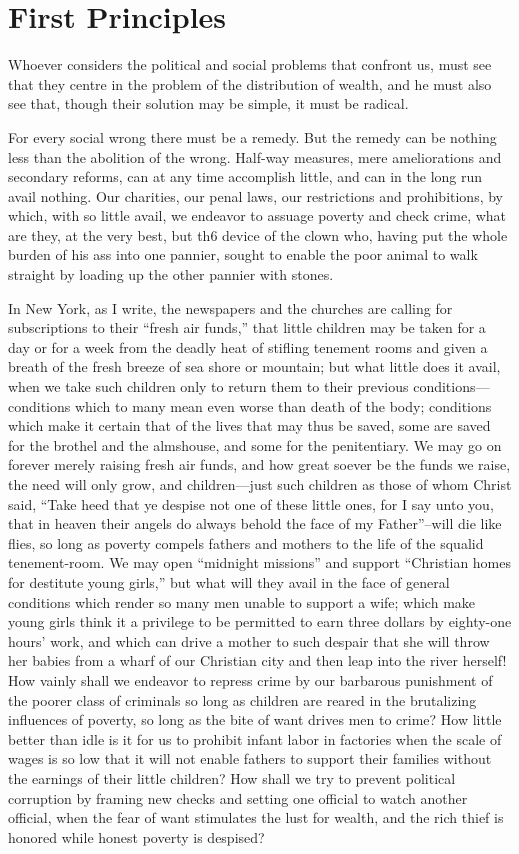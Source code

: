 \documentclass{book}
\begin{document}
\chapter{First Principles}
\label{chapter-9}
Whoever considers the political and social problems that confront us, must see that they centre in the problem of the distribution of wealth, and he must also see that, though their solution may be simple, it must be radical.

For every social wrong there must be a remedy. But the remedy can be nothing less than the abolition of the wrong. Half-way measures, mere ameliorations and secondary reforms, can at any time accomplish little, and can in the long run avail nothing. Our charities, our penal laws, our restrictions and prohibitions, by which, with so little avail, we endeavor to assuage poverty and check crime, what are they, at the very best, but th6 device of the clown who, having put the whole burden of his ass into one pannier, sought to enable the poor animal to walk straight by loading up the other pannier with stones.

In New York, as I write, the newspapers and the churches are calling for subscriptions to their “fresh air funds,” that little children may be taken for a day or for a week from the deadly heat of stifling tenement rooms and given a breath of the fresh breeze of sea shore or mountain; but what little does it avail, when we take such children only to return them to their previous conditions—conditions which to many mean even worse than death of the body; conditions which make it certain that of the lives that may thus be saved, some are saved for the brothel and the almshouse, and some for the penitentiary. We may go on forever merely raising fresh air funds, and how great soever be the funds we raise, the need will only grow, and children—just such children as those of whom Christ said, “Take heed that ye despise not one of these little ones, for I say unto you, that in heaven their angels do always behold the face of my Father”–will die like flies, so long as poverty compels fathers and mothers to the life of the squalid tenement-room. We may open “midnight missions” and support “Christian homes for destitute young girls,” but what will they avail in the face of general conditions which render so many men unable to support a wife; which make young girls think it a privilege to be permitted to earn three dollars by eighty-one hours’ work, and which can drive a mother to such despair that she will throw her babies from a wharf of our Christian city and then leap into the river herself! How vainly shall we endeavor to repress crime by our barbarous punishment of the poorer class of criminals so long as children are reared in the brutalizing influences of poverty, so long as the bite of want drives men to crime? How little better than idle is it for us to prohibit infant labor in factories when the scale of wages is so low that it will not enable fathers to support their families without the earnings of their little children? How shall we try to prevent political corruption by framing new checks and setting one official to watch another official, when the fear of want stimulates the lust for wealth, and the rich thief is honored while honest poverty is despised?
\end{document}
